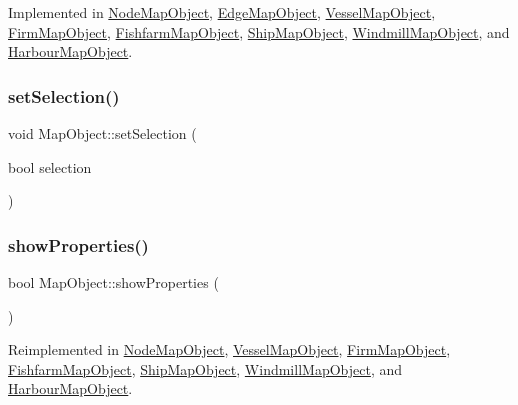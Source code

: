 Implemented in \mbox{\hyperlink{class_node_map_object_af6707ce2743bea4f8921d0cb124f29c9}{Node\+Map\+Object}}, \mbox{\hyperlink{class_edge_map_object_a5a67249e9896a6931eb5e4819e069c00}{Edge\+Map\+Object}}, \mbox{\hyperlink{class_vessel_map_object_a7f982641edc34a85fd3fbfc81c7c9a68}{Vessel\+Map\+Object}}, \mbox{\hyperlink{class_firm_map_object_abdbe45cc9a667c24034d9830d452d8c8}{Firm\+Map\+Object}}, \mbox{\hyperlink{class_fishfarm_map_object_ae5940a46e28dbe1886efd6db689b996a}{Fishfarm\+Map\+Object}}, \mbox{\hyperlink{class_ship_map_object_aaa5699009b3f1bc4d1c2a64ac3eb445c}{Ship\+Map\+Object}}, \mbox{\hyperlink{class_windmill_map_object_ac948b3ca6bebec5a1b99375acb557d57}{Windmill\+Map\+Object}}, and \mbox{\hyperlink{class_harbour_map_object_aa0429983795942fbf7143c081d679e0a}{Harbour\+Map\+Object}}.

\mbox{\label{class_map_object_ac127d8a4ba37ebce236c5f7dcf688273}} 
\subsubsection{\texorpdfstring{setSelection()}{setSelection()}}
{\footnotesize\ttfamily void Map\+Object\+::set\+Selection (\begin{DoxyParamCaption}\item[{bool}]{selection }\end{DoxyParamCaption})\hspace{0.3cm}{\ttfamily [virtual]}}

\mbox{\label{class_map_object_ac58ccb02d5d96d934939b217020c822c}} 
\subsubsection{\texorpdfstring{showProperties()}{showProperties()}}
{\footnotesize\ttfamily bool Map\+Object\+::show\+Properties (\begin{DoxyParamCaption}{ }\end{DoxyParamCaption})\hspace{0.3cm}{\ttfamily [virtual]}}



Reimplemented in \mbox{\hyperlink{class_node_map_object_a58403912a2303138ee20e727c1c4a1b7}{Node\+Map\+Object}}, \mbox{\hyperlink{class_vessel_map_object_adb4af9fdb30c1e7501bba6f74dfd42c0}{Vessel\+Map\+Object}}, \mbox{\hyperlink{class_firm_map_object_a61a442f9a8afc283bdf659a63f092ff5}{Firm\+Map\+Object}}, \mbox{\hyperlink{class_fishfarm_map_object_a88d9da326b469b56a346bed0572c0ab6}{Fishfarm\+Map\+Object}}, \mbox{\hyperlink{class_ship_map_object_a066dd918f052af419df95d101a36c0b8}{Ship\+Map\+Object}}, \mbox{\hyperlink{class_windmill_map_object_a692d7518785f4894fae0abf5776bd8c9}{Windmill\+Map\+Object}}, and \mbox{\hyperlink{class_harbour_map_object_a65c4f99a5a68bd4dc7dda0b49b18adac}{Harbour\+Map\+Object}}.

